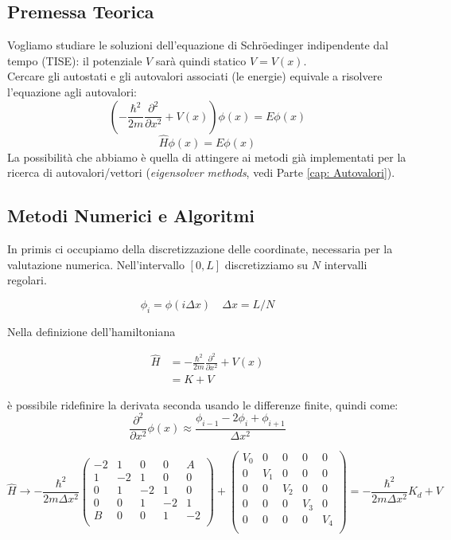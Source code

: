 \subsection{Premessa Teorica}
Vogliamo studiare le soluzioni dell'equazione di Schröedinger indipendente dal tempo (TISE): il potenziale $V$ sarà quindi statico $V = V(x)$.\\
Cercare gli autostati e gli autovalori associati (le energie) equivale a risolvere l'equazione agli autovalori:
$$\left( -\frac{\hbar^2}{2m}\frac{\partial^2}{\partial x^2} + V(x) \right) \phi(x) = E\phi(x)$$
\[
    \hat H \phi(x) = E \phi(x)
\]
La possibilità che abbiamo è quella di attingere ai metodi già implementati per la ricerca di autovalori/vettori (\textit{eigensolver methods}, vedi Parte \ref{cap: Autovalori}).


\subsection{Metodi Numerici e Algoritmi} 
In primis ci occupiamo della discretizzazione delle coordinate, necessaria per la valutazione numerica. Nell'intervallo $[0,L]$ discretizziamo su $N$ intervalli regolari.

\begin{equation*}
    \phi_i = \phi(i \Delta x) \quad \Delta x = L/N
\end{equation*}

\medskip\noindent
Nella definizione dell'hamiltoniana

\begin{align*}
\hat H &= -\frac{\hbar^2}{2m}\frac{\partial^2}{\partial x^2} + V(x)  \\
 &= K+V
\end{align*}

è possibile ridefinire la derivata seconda usando le differenze finite, quindi come:
\[
    \frac{\partial^2}{\partial x^2} \phi(x) \approx \frac{\phi_{i-1} - 2\phi_i + \phi_{i+1} }{\Delta x^2}
\]

\begin{equation*}
    \hat H  \to - \frac{\hbar^2}{2m \Delta x^2} \begin{pmatrix} 
-2 & 1 & 0 & 0 & A \\ 
 1 & -2 & 1 & 0 & 0 \\ 
 0 & 1 & -2 & 1 & 0 \\ 
 0 & 0 & 1 & -2 & 1 \\
 B & 0 & 0 & 1 & -2 \\ 
\end{pmatrix} + \begin{pmatrix} 
V_0 & 0 & 0 & 0 & 0 \\
0 & V_1 & 0 & 0 & 0 \\
0 & 0 & V_2 & 0 & 0 \\
0 & 0 & 0 & V_3 & 0 \\
0 & 0 & 0 & 0 & V_4 \\
\end{pmatrix} = - \frac{\hbar^2}{2m \Delta x^2} K_d + V
\end{equation*}

